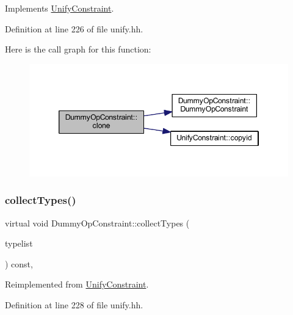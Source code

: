 Implements \mbox{\hyperlink{class_unify_constraint_a4f068343932637d355644bb21559aa12}{Unify\+Constraint}}.



Definition at line 226 of file unify.\+hh.

Here is the call graph for this function\+:
\nopagebreak
\begin{figure}[H]
\begin{center}
\leavevmode
\includegraphics[width=346pt]{class_dummy_op_constraint_a86d183fe63aec86dc883c626287f32ed_cgraph}
\end{center}
\end{figure}
\mbox{\label{class_dummy_op_constraint_a577187689bb53d42fff84328d474c5db}} 
\subsubsection{\texorpdfstring{collectTypes()}{collectTypes()}}
{\footnotesize\ttfamily virtual void Dummy\+Op\+Constraint\+::collect\+Types (\begin{DoxyParamCaption}\item[{vector$<$ \mbox{\hyperlink{class_unify_datatype}{Unify\+Datatype}} $>$ \&}]{typelist }\end{DoxyParamCaption}) const\hspace{0.3cm}{\ttfamily [inline]}, {\ttfamily [virtual]}}



Reimplemented from \mbox{\hyperlink{class_unify_constraint_acb83b6bea3b21e13054e72ac9cfaba0f}{Unify\+Constraint}}.



Definition at line 228 of file unify.\+hh.

\mbox{\label{class_dummy_op_constraint_aed05c6e3babcb9306d10e8a5379b146b}} 
